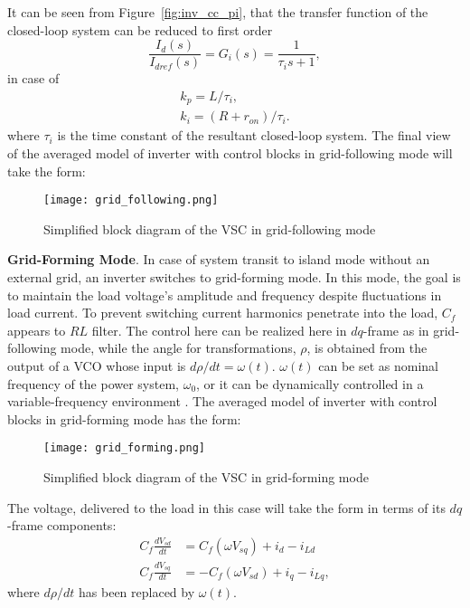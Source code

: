 It can be seen from Figure~\cref{fig:inv_cc_pi}, that the transfer function of the closed-loop system can be reduced to first order
\begin{equation}
    \frac{I_{d}(s)}{I_{d r e f}(s)}=G_{i}(s)=\frac{1}{\tau_{i} s+1},
\end{equation}
in case of
\begin{equation}
    \begin{array}{l}
k_{p}=L / \tau_{i}, \\
k_{i}=\left(R+r_{o n}\right) / \tau_{i}.
\end{array}
\label{eq:cc_pi}
\end{equation}
where $\tau_i$ is the time constant of the resultant closed-loop system. The final view of the averaged model of inverter with control blocks in grid-following mode will take the form:
\begin{figure}[htbp]
    \centering
    \texttt{[image: grid\_following.png]}
    \caption{Simplified block diagram of the VSC in grid-following mode}
    \label{fig:inv_cc}
\end{figure}

\textbf{Grid-Forming Mode}. In case of system transit to island mode without an external grid, an inverter switches to grid-forming mode. In this mode, the goal is to maintain the load voltage's amplitude and frequency despite fluctuations in load current. To prevent switching current harmonics penetrate into the load, $C_f$ appears to $RL$ filter. The control here can be realized here in $dq$-frame as in grid-following mode, while the angle for transformations, $\rho$, is obtained from the output of a VCO whose input is $d\rho/dt = \omega(t)$. $\omega(t)$ can be set as nominal frequency of the power system, $\omega_0$, or it can be dynamically controlled in a variable-frequency environment \autocite{5275592}. The averaged model of inverter with control blocks in grid-forming mode has the form:
\begin{figure}[htbp]
    \centering
    \texttt{[image: grid\_forming.png]}
    \caption{Simplified block diagram of the VSC in grid-forming mode}
    \label{fig:inv_gf}
\end{figure}

The voltage, delivered to the load in this case will take the form in terms of its $dq$-frame components:
\begin{equation}
    \begin{aligned}
        C_{f} \frac{d V_{s d}}{d t} & =C_{f}\left(\omega V_{s q}\right)+i_{d}-i_{L d} \\
        C_{f} \frac{d V_{s q}}{d t} & =-C_{f}\left(\omega V_{s d}\right)+i_{q}-i_{L q},
    \end{aligned}
    \label{eq:inv_vc}
\end{equation}
where $d\rho/dt$ has been replaced by $\omega(t)$. 

